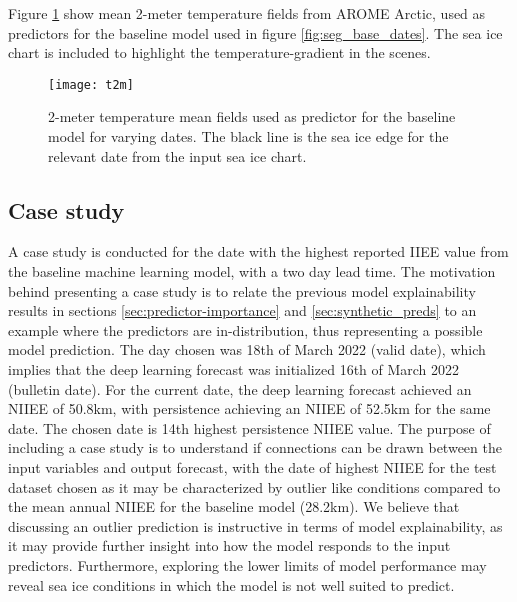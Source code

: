 \documentclass[../main/thesis.tex]{subfiles}
\begin{document}
Figure \ref{fig:t2m_dates} show mean 2-meter temperature fields from AROME Arctic, used as predictors for the baseline model used in figure \ref{fig:seg_base_dates}. The sea ice chart is included to highlight the temperature-gradient in the scenes.

\begin{figure}
    \centering
    \texttt{[image: t2m]}
    \caption{\label{fig:t2m_dates}2-meter temperature mean fields used as predictor for the baseline model for varying dates. The black line is the sea ice edge for the relevant date from the input sea ice chart.}
\end{figure}

\subsection{Case study}
A case study is conducted for the date with the highest reported IIEE value from the baseline machine learning model, with a two day lead time. The motivation behind presenting a case study is to relate the previous model explainability results in sections \ref{sec:predictor-importance} and \ref{sec:synthetic_preds} to an example where the predictors are in-distribution, thus representing a possible model prediction. The day chosen was 18th of March 2022 (valid date), which implies that the deep learning forecast was initialized 16th of March 2022 (bulletin date). For the current date, the deep learning forecast achieved an NIIEE of 50.8km, with persistence achieving an NIIEE of 52.5km for the same date. The chosen date is 14th highest persistence NIIEE value. The purpose of including a case study is to understand if connections can be drawn between the input variables and output forecast, with the date of highest NIIEE for the test dataset chosen as it may be characterized by outlier like conditions compared to the mean annual NIIEE for the baseline model (28.2km). We believe that discussing an outlier prediction is instructive in terms of model explainability, as it may provide further insight into how the model responds to the input predictors. Furthermore, exploring the lower limits of model performance may reveal sea ice conditions in which the model is not well suited to predict.
\end{document}
